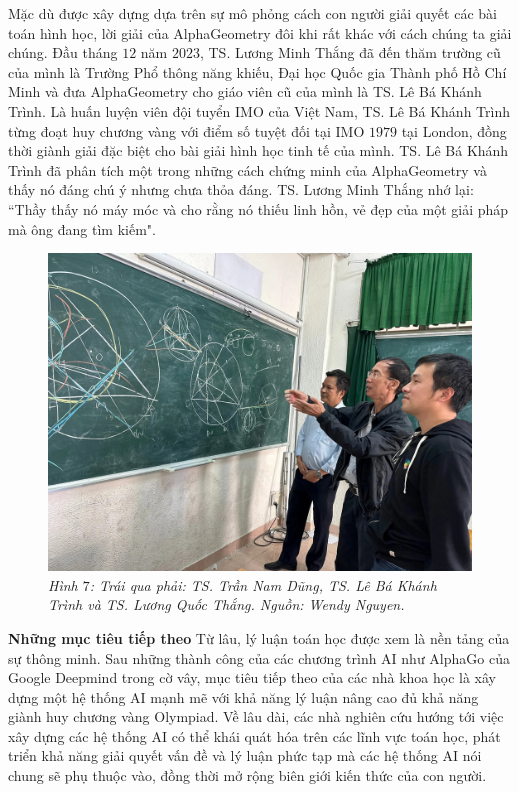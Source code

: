 \begin{multicols}{2}
	\vskip 0.1cm
	Mặc dù được xây dựng dựa trên sự mô phỏng cách con người giải quyết các bài toán hình học, lời giải của AlphaGeometry đôi khi rất khác với cách chúng ta giải chúng. Đầu tháng $12$ năm $2023$, TS. Lương Minh Thắng đã đến thăm trường cũ của mình là Trường Phổ thông năng khiếu, Đại học Quốc gia Thành phố Hồ Chí Minh và đưa AlphaGeometry cho giáo viên cũ của mình là TS. Lê Bá Khánh Trình. Là huấn luyện viên đội tuyển IMO của Việt Nam, TS. Lê Bá Khánh Trình từng đoạt huy chương vàng với điểm số tuyệt đối tại IMO $1979$ tại London, đồng thời giành giải đặc biệt cho bài giải hình học tinh tế của mình. TS. Lê Bá Khánh Trình đã phân tích một trong những cách chứng minh của AlphaGeometry và thấy nó đáng chú ý nhưng chưa thỏa đáng. TS. Lương Minh Thắng nhớ lại: ``Thầy thấy nó máy móc và cho rằng nó thiếu linh hồn, vẻ đẹp của một giải pháp mà ông đang tìm kiếm".
	\begin{figure}[H]
		\vspace*{-5pt}
		\centering
		\captionsetup{labelformat= empty, justification=centering}
		\includegraphics[width= 1\linewidth]{geometers.jpg}
		\caption{\small\textit{\color{timhieukhoahoc}Hình $7$: Trái qua phải: TS. Trần Nam Dũng, TS. Lê Bá Khánh Trình và TS. Lương Quốc Thắng. Nguồn: Wendy Nguyen.}}
		\vspace*{-10pt}
	\end{figure}
	\textbf{\color{timhieukhoahoc}Những mục tiêu tiếp theo}
	\vskip 0.1cm
	Từ lâu, lý luận toán học được xem là nền tảng của sự thông minh. Sau những thành công của các chương trình AI như AlphaGo của Google Deepmind trong cờ vây, mục tiêu tiếp theo của các nhà khoa học là xây dựng một hệ thống AI mạnh mẽ với khả năng lý luận nâng cao đủ khả năng giành huy chương vàng Olympiad. Về lâu dài, các nhà nghiên cứu hướng tới việc xây dựng các hệ thống AI có thể khái quát hóa trên các lĩnh vực toán học, phát triển khả năng giải quyết vấn đề và lý luận phức tạp mà các hệ thống AI nói chung sẽ phụ thuộc vào, đồng thời mở rộng biên giới kiến thức của con người.

\end{multicols}

